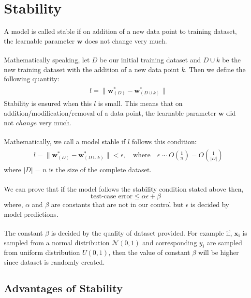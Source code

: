 \documentclass[12pt]{article}
\begin{document}
\section{Stability}
A model is called stable if on addition of a new data point to training dataset, the learnable parameter $\boldsymbol{w}$ does not change very much. 
\\ \\
Mathematically speaking, let $D$ be our initial training dataset and $D \cup k$ be the new training dataset with the addition of a new data point $k$. Then we define the following quantity:   
\begin{gather}
    \begin{aligned}
        & l = \|\boldsymbol{w}^*_{(D)} - \boldsymbol{w}^*_{(D \cup k)}\| \nonumber
    \end{aligned}
\end{gather}
Stability is ensured when this $l$ is small. This means that on addition/modification/removal of a data point, the learnable parameter $\boldsymbol{w}$ did not $change$ very much.\\
\\
Mathematically, we call a model stable if $l$ follows this condition:
\begin{gather}
    \begin{aligned}
        & l = \|\boldsymbol{w}^*_{(D)} - \boldsymbol{w}^*_{(D \cup k)}\| < \epsilon, \quad \text{where} \quad \epsilon \sim O(\frac{1}{n}) = O({\frac{1}{|D|}}) \nonumber
    \end{aligned}
\end{gather}
where $|D|$ = $n$  is the size of the complete dataset.
\\ \\
We can prove that if the model follows the stability condition stated above then, $$\text{test-case error} \leq \alpha\epsilon + \beta$$
where, $\alpha$ and $\beta$ are constants that are not in our control but $\epsilon$ is decided by model predictions. 
\\ \\The constant $\beta$ is decided by the quality of dataset provided. For example if, $\boldsymbol{x_i}$ is sampled from a normal distribution $\mathcal{N}(0,1)$ and corresponding $y_i$ are sampled from  uniform distribution $U(0,1)$, then the value of constant $\beta$ will be higher since dataset is randomly created.
\subsection{Advantages of Stability}
\end{document}
